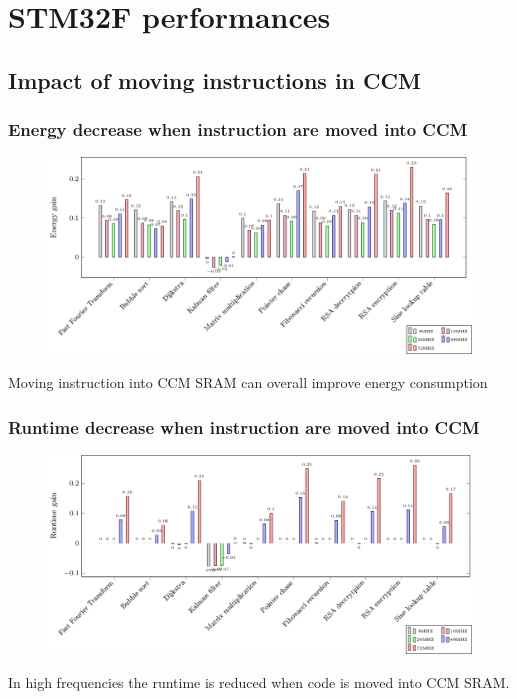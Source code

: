\documentclass[
	11pt, %
]{beamer}
\begin{document}
\section{STM32F performances}
\subsection{Impact of moving instructions in CCM}
\begin{frame}
	\frametitle{Energy decrease when instruction are moved into CCM}
	\begin{figure}
		\centering
        \includegraphics[scale=0.6]{data/stm32f_v2/code_flash_code_ccm/energy.pdf}
	\end{figure}
	Moving instruction into CCM SRAM can overall improve energy consumption 
\end{frame}

\begin{frame}
	\frametitle{Runtime decrease when instruction are moved into CCM}
	\begin{figure}
		\centering
        \includegraphics[scale=0.6]{data/stm32f_v2/code_flash_code_ccm/duration.pdf}
	\end{figure}
	In high frequencies the runtime is reduced when code is moved into CCM SRAM.
\end{frame}
\end{document}
